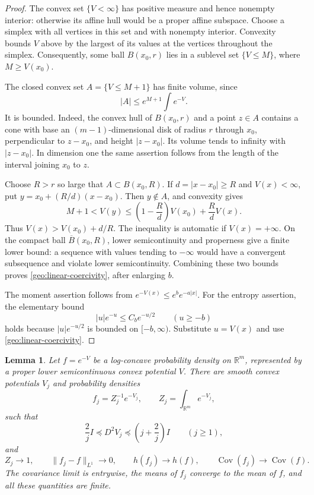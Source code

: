 \documentclass[11pt]{article}
\newtheorem{lemma}[theorem]{Lemma}
\theoremstyle{definition}
\theoremstyle{remark}
\numberwithin{equation}{section}
\begin{document}
\begin{proof}
The convex set $\{V<\infty\}$ has positive measure and hence nonempty
interior: otherwise its affine hull would be a proper affine subspace.
Choose a simplex with all vertices in this set and with nonempty interior.
Convexity bounds $V$ above by the largest of its values at the vertices
throughout the simplex.  Consequently, some ball $B(x_0,r)$ lies in a
sublevel set $\{V\leq M\}$, where $M\geq V(x_0)$.

The closed convex set $A=\{V\leq M+1\}$ has finite volume, since
\[
  |A|\leq e^{M+1}\int e^{-V}.
\]
It is bounded.  Indeed, the convex hull of $B(x_0,r)$ and a point $z\in A$
contains a cone with base an $(m-1)$-dimensional disk of radius $r$ through
$x_0$, perpendicular to $z-x_0$, and height $|z-x_0|$.  Its volume tends to
infinity with $|z-x_0|$.  In dimension one the same assertion follows from
the length of the interval joining $x_0$ to $z$.

Choose $R>r$ so large that $A\subset B(x_0,R)$.  If
$d=|x-x_0|\geq R$ and $V(x)<\infty$, put
$y=x_0+(R/d)(x-x_0)$.  Then $y\notin A$, and convexity gives
\[
  M+1<V(y)\leq \left(1-\frac Rd\right)V(x_0)+\frac RdV(x).
\]
Thus $V(x)>V(x_0)+d/R$.  The inequality is automatic if $V(x)=+\infty$.
On the compact ball $\overline B(x_0,R)$, lower semicontinuity and properness
give a finite lower bound: a sequence with values tending to $-\infty$
would have a convergent subsequence and violate lower semicontinuity.
Combining these two bounds proves \eqref{geo:linear-coercivity}, after
enlarging $b$.

The moment assertion follows from $e^{-V(x)}\leq e^b e^{-a|x|}$.
For the entropy assertion, the elementary bound
\begin{equation}\label{geo:entropy-domination}
  |u|e^{-u}\leq C_b e^{-u/2}\qquad(u\geq-b)
\end{equation}
holds because $|u|e^{-u/2}$ is bounded on $[-b,\infty)$.
Substitute $u=V(x)$ and use \eqref{geo:linear-coercivity}.
\end{proof}

\begin{lemma}\label{geo:approximation}
Let $f=e^{-V}$ be a log-concave probability density on $\mathbb R^m$, represented
by a proper lower semicontinuous convex potential $V$.  There are smooth
convex potentials $V_j$ and probability densities
\[
  f_j=Z_j^{-1}e^{-V_j},\qquad Z_j=\int_{\mathbb R^m}e^{-V_j},
\]
such that
\begin{equation}\label{geo:hessian-bounds}
  \frac2j I\preceq D^2V_j\preceq\left(j+\frac2j\right)I
  \qquad(j\geq1),
\end{equation}
and
\begin{equation}\label{geo:approximation-limits}
  Z_j\longrightarrow1,\qquad \lVert f_j-f\rVert_{L^1}\longrightarrow0,\qquad
  h(f_j)\longrightarrow h(f),\qquad
  \operatorname{Cov}(f_j)\longrightarrow\operatorname{Cov}(f).
\end{equation}
The covariance limit is entrywise, the means of $f_j$ converge to the mean
of $f$, and all these quantities are finite.
\end{lemma}
\end{document}
